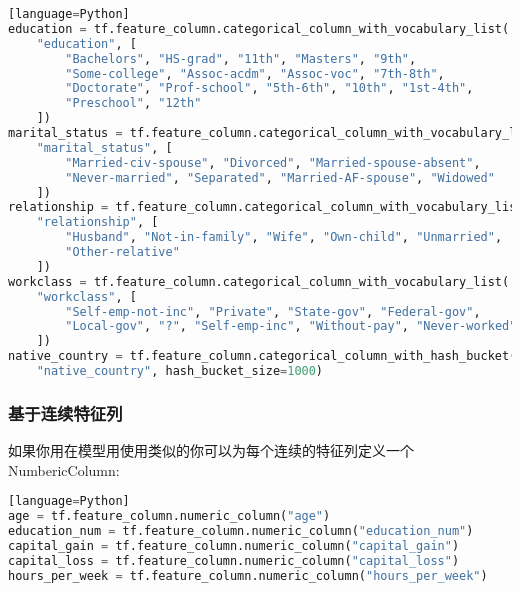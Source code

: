 \begin{lstlisting}[language=Python][language=Python]
education = tf.feature_column.categorical_column_with_vocabulary_list(
    "education", [
        "Bachelors", "HS-grad", "11th", "Masters", "9th",
        "Some-college", "Assoc-acdm", "Assoc-voc", "7th-8th",
        "Doctorate", "Prof-school", "5th-6th", "10th", "1st-4th",
        "Preschool", "12th"
    ])
marital_status = tf.feature_column.categorical_column_with_vocabulary_list(
    "marital_status", [
        "Married-civ-spouse", "Divorced", "Married-spouse-absent",
        "Never-married", "Separated", "Married-AF-spouse", "Widowed"
    ])
relationship = tf.feature_column.categorical_column_with_vocabulary_list(
    "relationship", [
        "Husband", "Not-in-family", "Wife", "Own-child", "Unmarried",
        "Other-relative"
    ])
workclass = tf.feature_column.categorical_column_with_vocabulary_list(
    "workclass", [
        "Self-emp-not-inc", "Private", "State-gov", "Federal-gov",
        "Local-gov", "?", "Self-emp-inc", "Without-pay", "Never-worked"
    ])
native_country = tf.feature_column.categorical_column_with_hash_bucket(
    "native_country", hash_bucket_size=1000)
\end{lstlisting}
\subsubsection{基于连续特征列}
如果你用在模型用使用类似的你可以为每个连续的特征列定义一个NumbericColumn:
\begin{lstlisting}[language=Python][language=Python]
age = tf.feature_column.numeric_column("age")
education_num = tf.feature_column.numeric_column("education_num")
capital_gain = tf.feature_column.numeric_column("capital_gain")
capital_loss = tf.feature_column.numeric_column("capital_loss")
hours_per_week = tf.feature_column.numeric_column("hours_per_week")
\end{lstlisting}

